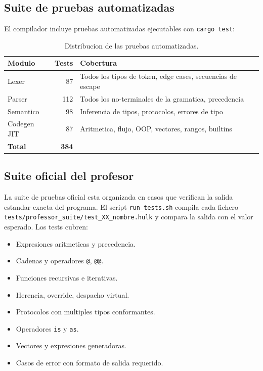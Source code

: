 \documentclass[12pt,a4paper]{article}
\begin{document}
\subsection{Suite de pruebas automatizadas}

El compilador incluye pruebas automatizadas ejecutables con \texttt{cargo test}:

\begin{table}[H]
\centering
\begin{tabular}{lrl}
\toprule
\textbf{Modulo} & \textbf{Tests} & \textbf{Cobertura} \\
\midrule
Lexer    & 87  & Todos los tipos de token, edge cases, secuencias de escape \\
Parser   & 112 & Todos los no-terminales de la gramatica, precedencia \\
Semantico & 98 & Inferencia de tipos, protocolos, errores de tipo \\
Codegen JIT & 87 & Aritmetica, flujo, OOP, vectores, rangos, builtins \\
\midrule
\textbf{Total} & \textbf{384} & \\
\bottomrule
\end{tabular}
\caption{Distribucion de las pruebas automatizadas.}
\end{table}

\subsection{Suite oficial del profesor}

La suite de pruebas oficial esta organizada en casos que verifican la salida estandar
exacta del programa. El script \texttt{run\_tests.sh} compila cada fichero
\texttt{tests/professor\_suite/test\_XX\_nombre.hulk} y compara la salida con el
valor esperado. Los tests cubren:

\begin{itemize}
  \item Expresiones aritmeticas y precedencia.
  \item Cadenas y operadores \texttt{@}, \texttt{@@}.
  \item Funciones recursivas e iterativas.
  \item Herencia, override, despacho virtual.
  \item Protocolos con multiples tipos conformantes.
  \item Operadores \texttt{is} y \texttt{as}.
  \item Vectores y expresiones generadoras.
  \item Casos de error con formato de salida requerido.
\end{itemize}
\end{document}
